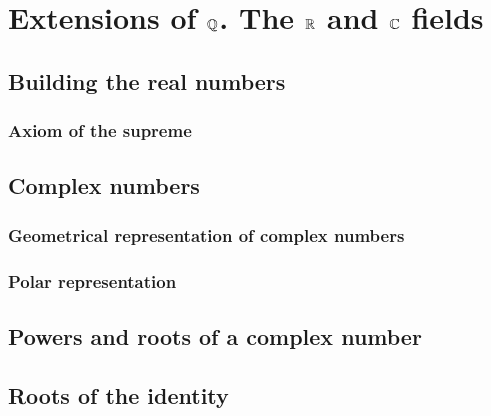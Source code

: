 \chapter{Extensions of $\Q$. The $\R$ and $\C$ fields}
\thispagestyle{noheaders}

\section{Building the real numbers}
\subsection{Axiom of the supreme}
\section{Complex numbers}
\subsection{Geometrical representation of complex numbers}
\subsection{Polar representation}
\section{Powers and roots of a complex number}
\section{Roots of the identity}
